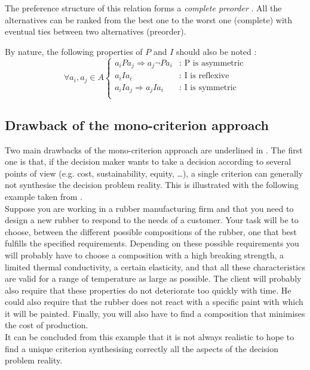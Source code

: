 The preference structure of this relation forms a \textit{complete preorder} \cite{Vin92}. All the alternatives can be ranked from the best one to the worst one (complete) with eventual ties between two alternatives (preorder).

By nature, the following properties of $P$ and $I$ should also be noted \cite{Vin92}:
\begin{equation}
    \forall a_i,a_j \in A \left \{
        \begin{split}
            a_iPa_j \Rightarrow a_j \neg P a_i &: \text{ P is asymmetric} \\
            a_iIa_i &: \text{ I is reflexive} \\
            a_iIa_j \Rightarrow a_j I a_i &: \text{ I is symmetric} \\
        \end{split}
        \right .
    \label{eq:properties_P_I}
\end{equation}

\subsection{Drawback of the mono-criterion approach} \label{sec:drawback_monocriteria}
Two main drawbacks of the mono-criterion approach are underlined in \cite{Bertrand2002}.
The first one is that, if the decision maker wants to take a decision according to several points of view (e.g. cost, sustainability, equity, \dots), a single criterion can generally not synthesise the decision problem reality.
This is illustrated with the following example taken from \cite{roy1book85}.\\
Suppose you are working in a rubber manufacturing firm and that you need to design a new rubber to respond to the needs of a customer.
Your task will be to choose, between the different possible compositions of the rubber, one that best fulfills the specified requirements.
Depending on these possible requirements you will probably have to choose a composition with a high breaking strength, a limited thermal conductivity, a certain elasticity, and that all these characteristics are valid for a range of temperature as large as possible. The client will probably also require that these properties do not deteriorate too quickly with time. He could also require that the rubber does not react with a specific paint with which it will be painted. Finally, you will also have to find a composition that minimises the cost of production.\\
It can be concluded from this example that it is not always realistic to hope to find a unique criterion synthesising correctly all the aspects of the decision problem reality.

